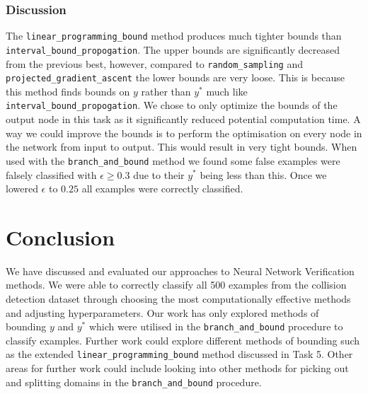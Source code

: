 \documentclass[11pt]{article}
\begin{document}
\subsubsection{Discussion}
The \texttt{linear\_programming\_bound} method produces much tighter bounds than \texttt{interval\_bound\_propogation}. 
The upper bounds are significantly decreased from the previous best, however, compared to \texttt{random\_sampling} and \texttt{projected\_gradient\_ascent} the lower bounds are very loose. 
This is because this method finds bounds on $y$ rather than $y^*$ much like \texttt{interval\_bound\_propogation}.
We chose to only optimize the bounds of the output node in this task as it significantly reduced potential computation time. 
A way we could improve the bounds is to perform the optimisation on every node in the network from input to output. 
This would result in very tight bounds. 
When used with the \texttt{branch\_and\_bound} method we found some false examples were falsely classified with $\epsilon \geq 0.3$ due to their $y^*$ being less than this. Once we lowered $\epsilon$ to $0.25$ all examples were correctly classified.

\section{Conclusion}

We have discussed and evaluated our approaches to Neural Network Verification methods. 
We were able to correctly classify all 500 examples from the collision detection dataset through choosing the most computationally effective methods and adjusting hyperparameters. 
Our work has only explored methods of bounding $y$ and $y^*$ which were utilised in the \texttt{branch\_and\_bound} procedure to classify examples.
Further work could explore different methods of bounding such as the extended \texttt{linear\_programming\_bound} method discussed in Task 5.
Other areas for further work could include looking into other methods for picking out and splitting domains in the \texttt{branch\_and\_bound} procedure.




\end{document}
